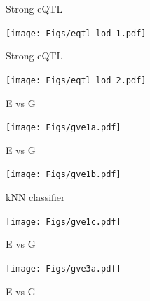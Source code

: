 \documentclass[12pt]{article}
\newcommand{\headsize}{\fontsize{35}{35} \selectfont}
\begin{document}
\newpage



\headsize \color{myyellow}
\hfill \begin{minipage}{5.75in}
\centering
Strong eQTL
\end{minipage}

\vfill

\centerline{\texttt{[image: Figs/eqtl\_lod\_1.pdf]}}

\newpage

\headsize \color{myyellow}
\hfill \begin{minipage}{5.75in}
\centering
Strong eQTL
\end{minipage}

\vfill

\centerline{\texttt{[image: Figs/eqtl\_lod\_2.pdf]}}

\newpage



\headsize \color{myyellow}
\hfill \begin{minipage}{5.75in}
\centering
E vs G
\end{minipage}

\vfill

\centerline{\texttt{[image: Figs/gve1a.pdf]}}

\newpage


\headsize \color{myyellow}
\hfill \begin{minipage}{5.75in}
\centering
E vs G
\end{minipage}

\vfill

\centerline{\texttt{[image: Figs/gve1b.pdf]}}

\newpage


\headsize \color{myyellow}
\hfill \begin{minipage}{5.75in}
\centering
kNN classifier
\end{minipage}

\vfill

\centerline{\texttt{[image: Figs/gve1c.pdf]}}

\newpage


\headsize \color{myyellow}
\hfill \begin{minipage}{5.75in}
\centering
E vs G
\end{minipage}

\vfill

\centerline{\texttt{[image: Figs/gve3a.pdf]}}

\newpage


\headsize \color{myyellow}
\hfill \begin{minipage}{5.75in}
\centering
E vs G
\end{minipage}
\end{document}
